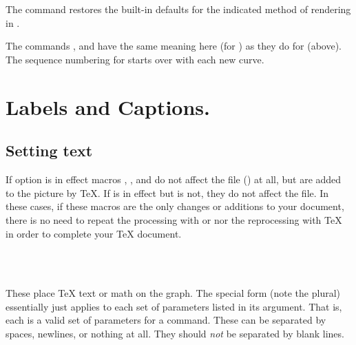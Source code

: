 \documentclass[letterpaper]{article}
\begin{document}
\begin{cd}
\\
\\
\end{cd}

The command  restores the built-in defaults for the
indicated method of rendering in .

The commands ,  and  have the
same meaning here (for ) as they do for 
(above). The sequence numbering for  starts over with each
new curve.

\section{Labels and Captions.}\label{labels}

\subsection{Setting text}\label{text}

If option  is in effect macros , ,
 and  do not affect the \MF{} file
() at all, but are added to the picture by \TeX{}. If
 is in effect but  is not, they do not
affect the \MP{} file. In these cases, if these macros are the only
changes or additions to your document, there is no need to repeat the
processing with \MF{} or \MP{} nor the reprocessing with \TeX{} in order
to complete your \TeX{} document.

\begin{cd}
\\
\\
%
%
\end{cd}

These place \TeX{} text or math on the graph. The special form
 (note the plural) essentially just applies  to
each set of parameters listed in its argument. That is, each
 is a valid set of parameters for a 
command. These can be separated by spaces, newlines, or nothing at all.
They should \emph{not} be separated by blank lines.
\end{document}
